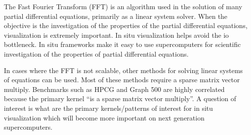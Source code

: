 \license


The Fast Fourier Transform (FFT) is an algorithm used in the solution of many partial differential equations, primarily as a linear system solver. When the objective is the investigation of the properties of the partial differential equations, visualization is extremely important. In situ visualization helps avoid the io bottleneck. In situ frameworks make it easy to use supercomputers for scientific investigation of the properties of partial differential equations. 

In cases where the FFT is not scalable, other methods for solving linear systems of equations can be used. Most of these methods require a sparse matrix vector multiply. Benchmarks such as HPCG and Graph 500 are highly correlated because the primary kernel ``is a sparse matrix vector multiply''. A question of interest is what are the primary kernels/patterns of interest for in situ visualization which will become more important on next generation supercomputers.


